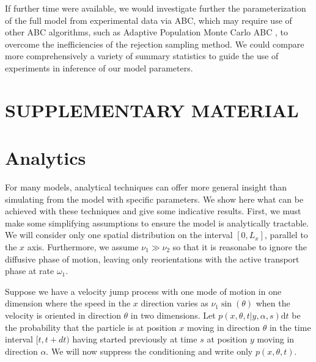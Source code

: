 \documentclass[twocolumn]{biophys}
\begin{document}
If further time were available, we would investigate further the parameterization of the full model from experimental data via ABC, which may require use of other ABC algorithms, such as Adaptive Population Monte Carlo ABC \citep{lenormand2013adaptive}, to overcome the inefficiencies of the rejection sampling method.
We could compare more comprehensively a variety of summary statistics to guide the use of experiments in inference of our model parameters.

\section*{SUPPLEMENTARY MATERIAL}


\vspace{1cm}
{}

\appendix
\section{Analytics}
\normalsize
For many models, analytical techniques can offer more general insight than simulating from the model with specific parameters.
We show here what can be achieved with these techniques and give some indicative results.
First, we must make some simplifying assumptions to ensure the model is analytically tractable. We will consider only one spatial distribution on the interval $[0,L_x]$, parallel to the $x$ axis.
Furthermore, we assume $\nu_1 \gg \nu_2$ so that it is reasonabe to ignore the diffusive phase of motion, leaving only reorientations with the active transport phase at rate $\omega_1$.

Suppose we have a velocity jump process with one mode of motion in one dimension where the speed in the $x$ direction varies as $\nu_1 \sin (\theta)$ when the velocity is oriented in direction $\theta$ in two dimensions.
Let $ p(x,\theta,t | y, \alpha, s)\text{d}t$ be the probability that the particle is at position $x$ moving in direction $\theta$ in the time interval $[t,t+dt)$ having started previously at time $s$ at position $y$ moving in direction $\alpha$.
We will now suppress the conditioning and write only $ p(x,\theta, t) $.
\end{document}
